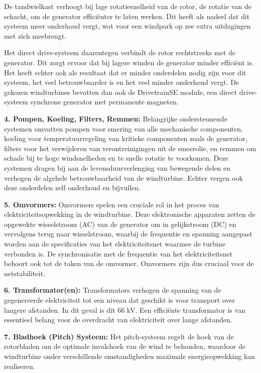 De tandwielkast verhoogt bij lage rotatiesnelheid van de rotor, de rotatie van de schacht, om de generator efficiënter te laten werken. Dit heeft als nadeel dat dit systeem meer onderhoud vergt, wat voor een windpark op zee extra uitdagingen met zich meebrengt.

Het direct drive-systeem daarentegen verbindt de rotor rechtstreeks met de generator. Dit zorgt ervoor dat bij lagere winden de generator minder efficiënt is. Het heeft echter ook als resultaat dat er minder onderdelen nodig zijn voor dit systeem, het veel betrouwbaarder is en het veel minder onderhoud vergt. De gekozen windturbines bevatten dan ook de DrivetrainSE module, een direct drive-systeem synchrone generator met permanente magneten.\cite{NREL_turbine_documentatie}

\textbf{4. Pompen, Koeling, Filters, Remmen:}
Belangrijke ondersteunende systemen omvatten pompen voor smering van alle mechanische componenten, koeling voor temperatuurregeling van kritieke componenten zoals de generator, filters voor het verwijderen van verontreinigingen uit de smeerolie, en remmen om schade bij te hoge windsnelheden en te snelle rotatie te voorkomen. Deze systemen dragen bij aan de levensduurverlenging van bewegende delen en verhogen de algehele betrouwbaarheid van de windturbine. Echter vergen ook deze onderdelen zelf onderhoud en bijvullen.

\textbf{5. Omvormers:}
Omvormers spelen een cruciale rol in het proces van elektriciteitsopwekking in de windturbine. Deze elektronische apparaten zetten de opgewekte wisselstroom (AC) van de generator om in gelijkstroom (DC) en vervolgens terug naar wisselstroom, waarbij de frequentie en spanning aangepast worden aan de specificaties van het elektriciteitsnet waarmee de turbine verbonden is. De synchronisatie met de frequentie van het elektriciteitsnet behoort ook tot de taken van de omvormer. Omvormers zijn dus cruciaal voor de netstabiliteit.

\textbf{6. Transformator(en):}
Transformators verhogen de spanning van de gegenereerde elektriciteit tot een niveau dat geschikt is voor transport over langere afstanden. In dit geval is dit 66 kV. Een efficiënte transformator is van essentieel belang voor de overdracht van elektriciteit over lange afstanden.

\textbf{7. Bladhoek (Pitch) Systeem:}
Het pitch-systeem regelt de hoek van de rotorbladen om de optimale invalshoek van de wind te behouden, waardoor de windturbine onder verschillende omstandigheden maximale energieopwekking kan realiseren.

